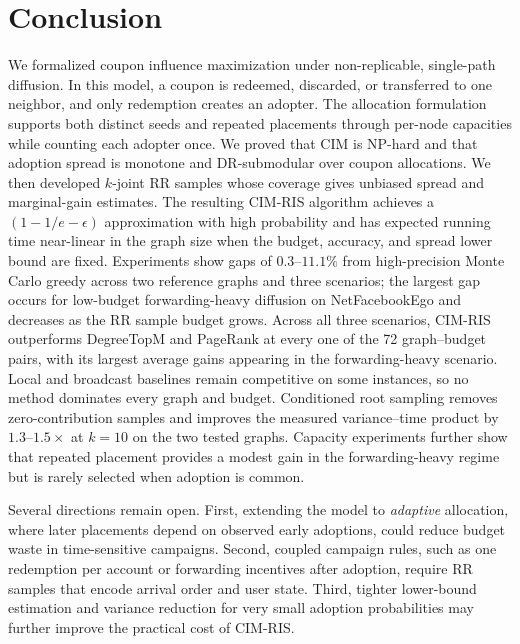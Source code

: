 \documentclass[sigconf,balance=false]{acmart}
\newcommand{\CIMRIS}{\textsc{CIM-RIS}}
\begin{document}
\section{Conclusion}
\label{sec:conclusion}

We formalized coupon influence maximization under non-replicable,
single-path diffusion.
In this model, a coupon is redeemed, discarded, or transferred to one
neighbor, and only redemption creates an adopter.
The allocation formulation supports both distinct seeds and repeated
placements through per-node capacities while counting each adopter once.
We proved that CIM is NP-hard and that adoption spread is monotone and
DR-submodular over coupon allocations.
We then developed $k$-joint RR samples whose coverage gives unbiased
spread and marginal-gain estimates.
The resulting \CIMRIS{} algorithm achieves a
$(1-1/e-\epsilon)$ approximation with high probability and has expected
running time near-linear in the graph size when the budget, accuracy, and
spread lower bound are fixed.
Experiments show gaps of $0.3$--$11.1\%$ from high-precision Monte Carlo
greedy across two reference graphs and three scenarios; the largest gap
occurs for low-budget forwarding-heavy diffusion on NetFacebookEgo and
decreases as the RR sample budget grows.
Across all three scenarios, \CIMRIS{} outperforms DegreeTopM and PageRank at
every one of the 72 graph--budget pairs, with its largest average gains
appearing in the forwarding-heavy scenario.
Local and broadcast baselines remain competitive on some instances, so
no method dominates every graph and budget.
Conditioned root sampling removes zero-contribution samples and improves
the measured variance--time product by $1.3$--$1.5\times$ at $k=10$ on
the two tested graphs. Capacity experiments further show that repeated
placement provides a modest gain in the forwarding-heavy regime but is
rarely selected when adoption is common.

Several directions remain open.
First, extending the model to \emph{adaptive} allocation, where later
placements depend on observed early adoptions, could
reduce budget waste in time-sensitive campaigns.
Second, coupled campaign rules, such as one redemption per account or
forwarding incentives after adoption, require RR samples that encode
arrival order and user state.
Third, tighter lower-bound estimation and variance reduction for very
small adoption probabilities may further improve the practical cost of
\CIMRIS{}.
\end{document}
